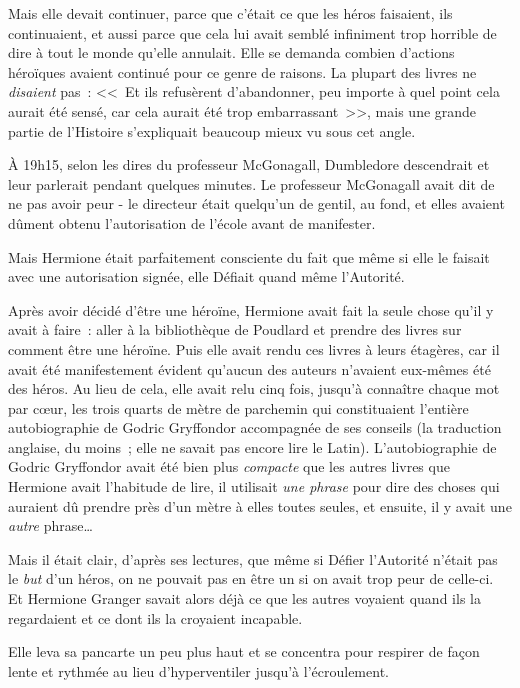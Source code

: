 Mais elle devait continuer, parce que c'était ce que les héros faisaient, ils continuaient, et aussi parce que cela lui avait semblé infiniment trop horrible de dire à tout le monde qu'elle annulait. Elle se demanda combien d'actions héroïques avaient continué pour ce genre de raisons. La plupart des livres ne \emph{disaient} pas~: <<~Et ils refusèrent d'abandonner, peu importe à quel point cela aurait été sensé, car cela aurait été trop embarrassant~>>, mais une grande partie de l'Histoire s'expliquait beaucoup mieux vu sous cet angle.

À 19h15, selon les dires du professeur McGonagall, Dumbledore descendrait et leur parlerait pendant quelques minutes. Le professeur McGonagall avait dit de ne pas avoir peur - le directeur était quelqu'un de gentil, au fond, et elles avaient dûment obtenu l'autorisation de l'école avant de manifester.

Mais Hermione était parfaitement consciente du fait que même si elle le faisait avec une autorisation signée, elle Défiait quand même l'Autorité.

Après avoir décidé d'être une héroïne, Hermione avait fait la seule chose qu'il y avait à faire~: aller à la bibliothèque de Poudlard et prendre des livres sur comment être une héroïne. Puis elle avait rendu ces livres à leurs étagères, car il avait été manifestement évident qu'aucun des auteurs n'avaient eux-mêmes été des héros. Au lieu de cela, elle avait relu cinq fois, jusqu'à connaître chaque mot par cœur, les trois quarts de mètre de parchemin qui constituaient l'entière autobiographie de Godric Gryffondor accompagnée de ses conseils (la traduction anglaise, du moins~; elle ne savait pas encore lire le Latin). L'autobiographie de Godric Gryffondor avait été bien plus \emph{compacte} que les autres livres que Hermione avait l'habitude de lire, il utilisait \emph{une phrase} pour dire des choses qui auraient dû prendre près d'un mètre à elles toutes seules, et ensuite, il y avait une \emph{autre} phrase…

Mais il était clair, d'après ses lectures, que même si Défier l'Autorité n'était pas le \emph{but} d'un héros, on ne pouvait pas en être un si on avait trop peur de celle-ci. Et Hermione Granger savait alors déjà ce que les autres voyaient quand ils la regardaient et ce dont ils la croyaient incapable.

Elle leva sa pancarte un peu plus haut et se concentra pour respirer de façon lente et rythmée au lieu d'hyperventiler jusqu'à l'écroulement.

